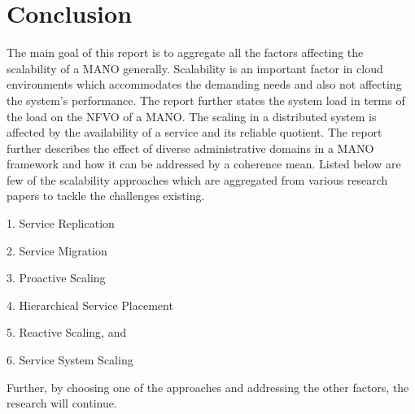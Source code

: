 \chapter{Conclusion}
\label{ch:Conclusion}

The main goal of this report is to aggregate all the factors affecting the scalability of a MANO generally. Scalability is an important factor in cloud environments which accommodates the demanding needs and also not affecting the system’s performance. The report further states the system load in terms of the load on the NFVO of a MANO. The scaling in a distributed system is affected by the availability of a service and its reliable quotient. The report further describes the effect of diverse administrative domains in a MANO framework and how it can be addressed by a coherence mean. Listed below are few of the scalability approaches which are aggregated from various research papers to tackle the challenges existing.

1.    Service Replication

2.    Service Migration

3.    Proactive Scaling

4.    Hierarchical Service Placement

5.    Reactive Scaling, and

6. 	  Service System Scaling



Further, by choosing one of the approaches and addressing the other factors, the research will continue.



